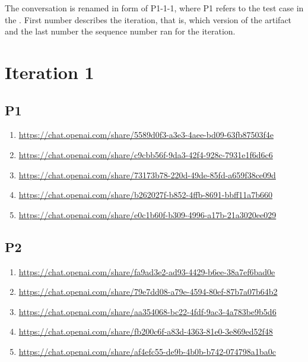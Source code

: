 

The conversation is renamed in form of P1-1-1, where P1 refers to the test case in the \textcite{act_rule_g88}. First number describes the iteration, that is, which version of the artifact and the last number the sequence number ran for the iteration.

\section{Iteration 1}

\subsection{P1\label{P1-1}}

\begin{enumerate}
    \item \href{https://chat.openai.com/share/5589d0f3-a3e3-4aee-bd09-63fb87503f4e}{https://chat.openai.com/share/5589d0f3-a3e3-4aee-bd09-63fb87503f4e}
    \item \href{https://chat.openai.com/share/c9cbb56f-9da3-42f4-928c-7931e1f6d6c6}{https://chat.openai.com/share/c9cbb56f-9da3-42f4-928c-7931e1f6d6c6}
    \item \href{https://chat.openai.com/share/73173b78-220d-49de-85fd-a659f38ce09d}{https://chat.openai.com/share/73173b78-220d-49de-85fd-a659f38ce09d}
    \item \href{https://chat.openai.com/share/b262027f-b852-4ffb-8691-bbff11a7b660}{https://chat.openai.com/share/b262027f-b852-4ffb-8691-bbff11a7b660}
    \item \href{https://chat.openai.com/share/e0c1b60f-b309-4996-a17b-21a3020ee029}{https://chat.openai.com/share/e0c1b60f-b309-4996-a17b-21a3020ee029}
\end{enumerate}

\subsection{P2\label{P2-1}}

\begin{enumerate}
    \item \href{https://chat.openai.com/share/fa9ad3e2-ad93-4429-b6ee-38a7ef6bad0e}{https://chat.openai.com/share/fa9ad3e2-ad93-4429-b6ee-38a7ef6bad0e}
    \item \href{https://chat.openai.com/share/79e7dd08-a79e-4594-80ef-87b7a07b64b2}{https://chat.openai.com/share/79e7dd08-a79e-4594-80ef-87b7a07b64b2}
    \item \href{https://chat.openai.com/share/aa354068-bc22-4fdf-9ac3-4a783be9b5d6}{https://chat.openai.com/share/aa354068-bc22-4fdf-9ac3-4a783be9b5d6}
    \item \href{https://chat.openai.com/share/fb200c6f-a83d-4363-81e0-3e869ed52f48}{https://chat.openai.com/share/fb200c6f-a83d-4363-81e0-3e869ed52f48}
    \item \href{https://chat.openai.com/share/af4efc55-de9b-4b0b-b742-074798a1ba0c}{https://chat.openai.com/share/af4efc55-de9b-4b0b-b742-074798a1ba0c}
\end{enumerate}

